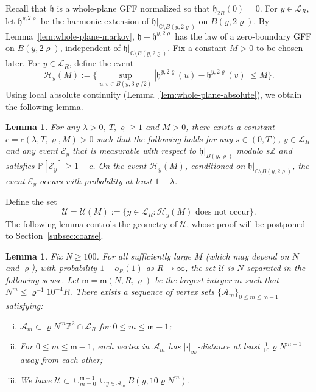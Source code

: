 \documentclass[a4paper]{article}
\numberwithin{equation}{section}
\newtheorem{lemma}[theorem]{Lemma}
\numberwithin{equation}{section}
\renewcommand{\1}{\mathbf{1}}
\begin{document}
Recall that $\mathfrak h$ is a whole-plane GFF normalized so that $\mathfrak h_{2R} (0) = 0$. For $y \in \mathscr{L}_R$, let $\mathfrak h^{y, 2\varrho}$ be the harmonic extension of $\mathfrak h|_{\mathbb{C} \setminus B(y, 2\varrho)}$ on $B(y, 2\varrho)$. By Lemma~\ref{lem:whole-plane-markov}, $\mathfrak h - \mathfrak h^{y, 2\varrho}$ has the law of a zero-boundary GFF on $B(y,2\varrho)$, independent of $\mathfrak h|_{\mathbb{C} \setminus B(y,2\varrho)}$. Fix a constant $M>0$ to be chosen later. For $y \in \mathscr{L}_R$, define the event
\begin{equation}\label{eq:def-nice}
\mathcal{H}_y(M) := \Big\{ \sup_{u,v \in B(y, 3\varrho/2)} | \mathfrak h^{y, 2\varrho} (u) - \mathfrak h^{y, 2\varrho} (v)| \leq M \Big\}.
\end{equation}
Using local absolute continuity (Lemma~\ref{lem:whole-plane-absolute}), we obtain the following lemma.
\begin{lemma}\label{lem:sec5-pre}
    For any $\lambda>0$, $T,\varrho \ge 1$ and $M >0$, there exists a constant $c=c(\lambda,T,\varrho,M)>0$ such that the following holds for any $s \in (0,T)$, $y \in \mathscr{L}_R$ and any event $\mathcal{E}_y$ that is measurable with respect to $\mathfrak h|_{B(y, \varrho)}$ modulo $s \mathbb{Z}$ and satisfies $\mathbb{P}[\mathcal{E}_y] \geq 1 - c$. On the event $\mathcal{H}_y(M)$, conditioned on $\mathfrak h|_{\mathbb{C} \setminus B(y,2\varrho)}$, the event $\mathcal{E}_y$ occurs with probability at least $1 - \lambda$.
\end{lemma}
Define the set
\begin{equation}
    \mathscr{U} = \mathscr{U}(M) := \{y \in \mathscr{L}_R: \mathcal{H}_y(M) \mbox{ does not occur} \}.
\end{equation}
The following lemma controls the geometry of $\mathscr{U}$, whose proof will be postponed to Section~\ref{subsec:coarse}.

\begin{lemma}\label{lem:gff-nice}
    Fix $N \geq 100$. For all sufficiently large $M$ (which may depend on $N$ and $\varrho$), with probability $1 - o_R(1)$ as $R \to \infty$, the set $\mathscr{U}$ is $N$-separated in the following sense. Let $\mathsf{m} = \mathsf{m}(N, R, \varrho)$ be the largest integer $m$ such that $N^m \leq \varrho^{-1} 10^{-4} R$. There exists a sequence of vertex sets $\{\mathcal{A}_m\}_{0 \leq m \leq \mathsf m - 1}$ satisfying:
    \begin{enumerate}[i.]
        \item $\mathcal{A}_m \subset \varrho N^m \mathbb{Z}^2 \cap \mathscr{L}_R$ for $0 \leq m \leq \mathsf m - 1$; \label{lem5.4-condition1}
        \item For $0 \leq m \leq \mathsf m - 1$, each vertex in $\mathcal{A}_m$ has $|\cdot|_\infty$-distance at least $\frac{1}{10} \varrho N^{m+1}$ away from each other; \label{lem5.4-condition2}
        \item We have $\mathscr{U} \subset \cup_{m=0}^{\mathsf{m} - 1} \cup_{y \in \mathcal{A}_m} B(y, 10 \varrho N^m)$. \label{lem5.4-condition3}
    \end{enumerate}
\end{lemma}
\end{document}
